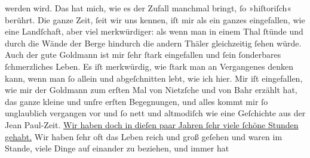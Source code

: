\begin{ledgroupsized}[t]{13cm}
                    werden wird. Das hat mich, wie es der Zufall manchmal bringt, ſo »hiſtoriſch«
                    berührt. Die ganze Zeit, ſeit wir uns kennen, iſt mir als ein ganzes
                    eingefallen, wie eine Landſchaft, {\pb}aber viel merkwürdiger: als
                    wenn man in einem Thal ſtünde und durch die Wände der Berge hindurch die andern
                    Thäler gleichzeitig ſehen würde.\pend
           \pstart
           Auch der gute Goldmann ist mir ſehr ſtark
                    eingefallen und ſein ſonderbares ſchmerzliches Leben. Es iſt merkwürdig, wie
                    ſtark man an Vergangenes denken kann, wenn man ſo allein und abgeſchnitten lebt,
                    wie ich hier. Mir iſt eingefallen, wie mir der Goldmann zum erſten Mal von Nietzſche und von Bahr erzählt
                    hat, das ganze kleine \label{K_L00545_2v}\label{K_L00545_2h} und unſre {\pb}erſten Begegnungen, und
                    alles kommt mir ſo unglaublich vergangen vor und ſo nett und altmodiſch wie eine
                    Geſchichte aus der Jean Paul-Zeit. \uline{Wir haben doch in dieſen paar Jahren ſehr viele
                        ſchöne Stunden gehabt.} Wir haben ſehr oft das Leben reich und groß
                    geſehen und waren im Stande, viele Dinge auf einander zu beziehen, und immer hat

\end{ledgroupsized}
